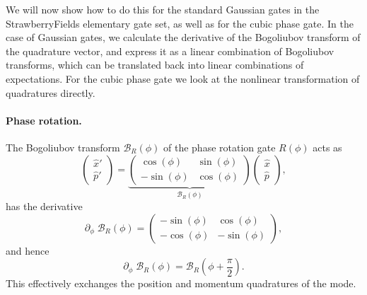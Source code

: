 \documentclass[aps,pra,10pt,twocolumn,groupedaddress,nofootinbib]{revtex4-1}
\theoremstyle{plain}
\newcommand{\x}{\hat{x}}
\newcommand{\p}{\hat{p}}
\renewcommand{\c}{\hat{c}}
\renewcommand{\d}{\hat{d}}
\newcommand{\G}{\mathcal{G}}
\begin{document}


We will now show how to do this for the standard Gaussian gates in the StrawberryFields elementary gate set, as well as for the cubic phase gate. In the case of Gaussian gates, we calculate the derivative of the Bogoliubov transform of the quadrature vector, and express it as a linear combination of Bogoliubov transforms, which can be translated back into linear combinations of expectations. For the cubic phase gate we look at the nonlinear transformation of quadratures directly.\\


\paragraph{Phase rotation.}
The Bogoliubov transform $ \mathcal{B}_R(\phi)$ of the phase rotation gate $R(\phi)$ acts as
\[
\begin{pmatrix}
\x'\\
\p'
\end{pmatrix} =  \underbrace{\begin{pmatrix} \cos(\phi) & \sin(\phi) \\
-\sin(\phi) & \cos(\phi) \end{pmatrix}}_{\mathcal{B}_R(\phi)}\begin{pmatrix} \x\\ \p \end{pmatrix}, \]
has the derivative
\[ \partial_{\phi} \; \mathcal{B}_R(\phi) = \begin{pmatrix} -\sin(\phi) & \cos(\phi) \\
-\cos(\phi) & -\sin(\phi) \end{pmatrix} ,\]
and hence
\[ \partial_{\phi} \; \mathcal{B}_R(\phi) = \mathcal{B}_R(\phi + \frac{\pi}{2}).\]
This effectively exchanges the position and momentum quadratures of the mode.\\
\end{document}
